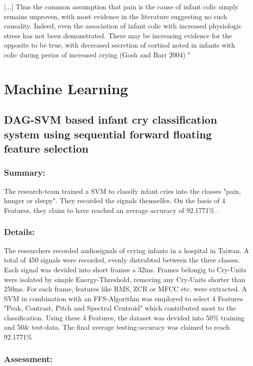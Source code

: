 \documentclass[11pt,twocolumn]{scrartcl}
\begin{document}
[...] Thus the common assumption that pain is the cause of infant colic simply remains unproven, with most evidence in the literature suggesting no such causality. Indeed, even the association of infant colic with increased physiologic stress has not been demonstrated. There may be increasing evidence for the opposite to be true, with decreased secretion of cortisol noted in infants with colic during perios of increased crying (Gosh and Barr 2004) "\cite{Shuvo2006}

\section{Machine Learning}

\subsection{DAG-SVM based infant cry classification system using sequential forward floating feature selection}

\subsubsection*{Summary:} 
The research-team trained a SVM to classify infant cries into the classes "pain, hunger or sleepy". They recorded the signals themselfes. On the basis of 4 Features, they claim to have reached an average accuracy of 92.1771\% . \cite{chang2017dag}

\subsubsection*{Details:}

The researchers recorded audiosignals of crying infants in a hospital in Taiwan. A total of 450 signals were recorded, evenly distrubted between the three classes. Each signal was devided into short frames a 32ms. Frames belongig to Cry-Units were isolated by simple Energy-Threshold, removing any Cry-Units shorter than 250ms. For each frame, features like RMS, ZCR or MFCC etc. were extracted. A SVM in combination with an FFS-Algorithm was employed to select 4 Features "Peak, Contrast, Pitch and Spectral Centroid" which contributed most to the classification. Using these 4 Features, the dataset was devided into 50\% training and 50\& test-data. The final average testing-accuracy was claimed to reach 92.1771\%

\subsubsection*{Assessment:}
\end{document}
